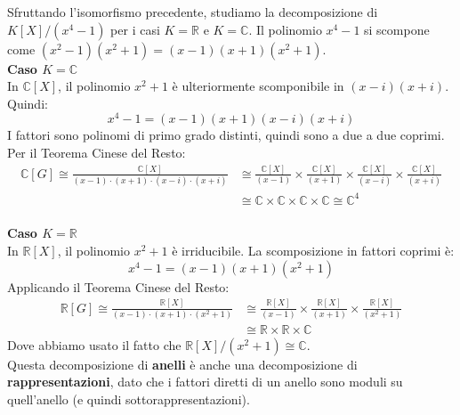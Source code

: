 {Sfruttando l'isomorfismo precedente, studiamo la decomposizione di $K[X]/(x^4 - 1)$ per i casi $K = \mathbb{R}$ e $K = \mathbb{C}$. Il polinomio $x^4 - 1$ si scompone come $(x^2 - 1)(x^2 + 1) = (x - 1)(x + 1)(x^2 + 1)$.\\

\textbf{Caso $K = \mathbb{C}$}\\
In $\mathbb{C}[X]$, il polinomio $x^2 + 1$ è ulteriormente scomponibile in $(x - i)(x + i)$. Quindi:
\[ x^4 - 1 = (x - 1)(x + 1)(x - i)(x + i) \]
I fattori sono polinomi di primo grado distinti, quindi sono a due a due coprimi. Per il Teorema Cinese del Resto:
\begin{align*}
\mathbb{C}[G] \cong \frac{\mathbb{C}[X]}{(x - 1) \cdot (x + 1) \cdot (x - i) \cdot (x + i)} &\cong \frac{\mathbb{C}[X]}{(x - 1)} \times \frac{\mathbb{C}[X]}{(x + 1)} \times \frac{\mathbb{C}[X]}{(x - i)} \times \frac{\mathbb{C}[X]}{(x + i)} \\
&\cong \mathbb{C} \times \mathbb{C} \times \mathbb{C} \times \mathbb{C} \cong \mathbb{C}^4
\end{align*}\\

\textbf{Caso $K = \mathbb{R}$}\\
In $\mathbb{R}[X]$, il polinomio $x^2 + 1$ è irriducibile. La scomposizione in fattori coprimi è:
\[ x^4 - 1 = (x - 1)(x + 1)(x^2 + 1) \]
Applicando il Teorema Cinese del Resto:
\begin{align*}
\mathbb{R}[G] \cong \frac{\mathbb{R}[X]}{(x - 1) \cdot (x + 1) \cdot (x^2 + 1)} &\cong \frac{\mathbb{R}[X]}{(x - 1)} \times \frac{\mathbb{R}[X]}{(x + 1)} \times \frac{\mathbb{R}[X]}{(x^2 + 1)} \\
&\cong \mathbb{R} \times \mathbb{R} \times \mathbb{C}
\end{align*}
Dove abbiamo usato il fatto che $\mathbb{R}[X]/(x^2 + 1) \cong \mathbb{C}$.\\

Questa decomposizione di \textbf{anelli} è anche una decomposizione di \textbf{rappresentazioni}, dato che i fattori diretti di un anello sono moduli su quell'anello (e quindi sottorappresentazioni).
}



